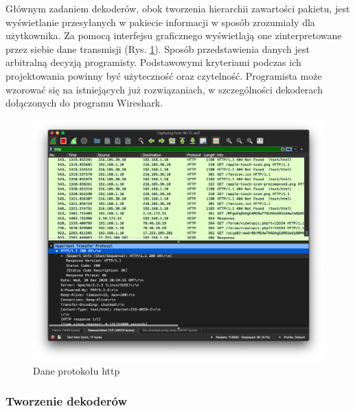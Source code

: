 \documentclass[a4paper, 11pt, twoside, openright]{article}
\begin{document}
	Głównym zadaniem dekoderów, obok tworzenia hierarchii zawartości pakietu, jest wyświetlanie przesyłanych w pakiecie informacji w sposób zrozumiały dla użytkownika.
	Za pomocą interfejsu graficznego wyświetlają one zinterpretowane przez siebie dane transmisji (Rys. \ref{fig:fis_http}). Sposób przedstawienia danych
	jest arbitralną decyzją programisty. Podstawowymi kryteriami podczas ich projektowania powinny być użyteczność oraz czytelność.
	Programista może wzorować się na istniejących już rozwiązaniach, w szczególności dekoderach dołączonych do programu Wireshark.

	\begin{figure}[h]
		\centering
			\includegraphics[width=1.0\textwidth]{img/screenshot_fis_http.png}
		\caption{Dane protokołu http}
		\label{fig:fis_http}
	\end{figure}


	\subsubsection{Tworzenie dekoderów}
\end{document}
